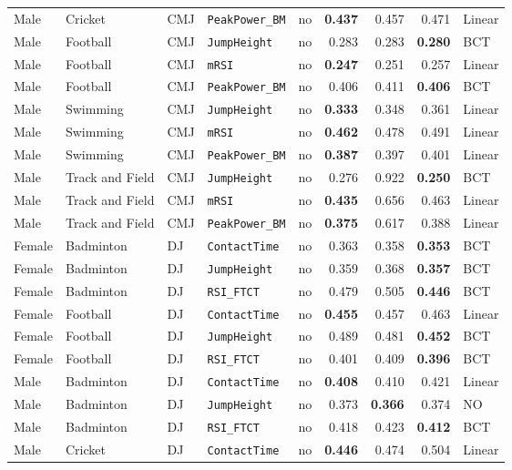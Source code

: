 {\begin{longtable}{lllllrrrl}
Male & Cricket & CMJ & \texttt{PeakPower\_BM} & no & \textbf{0.437} & 0.457 & 0.471 & Linear \\
Male & Football & CMJ & \texttt{JumpHeight} & no & 0.283 & 0.283 & \textbf{0.280} & BCT \\
Male & Football & CMJ & \texttt{mRSI} & no & \textbf{0.247} & 0.251 & 0.257 & Linear \\
Male & Football & CMJ & \texttt{PeakPower\_BM} & no & 0.406 & 0.411 & \textbf{0.406} & BCT \\
Male & Swimming & CMJ & \texttt{JumpHeight} & no & \textbf{0.333} & 0.348 & 0.361 & Linear \\
Male & Swimming & CMJ & \texttt{mRSI} & no & \textbf{0.462} & 0.478 & 0.491 & Linear \\
Male & Swimming & CMJ & \texttt{PeakPower\_BM} & no & \textbf{0.387} & 0.397 & 0.401 & Linear \\
Male & Track and Field & CMJ & \texttt{JumpHeight} & no & 0.276 & 0.922 & \textbf{0.250} & BCT \\
Male & Track and Field & CMJ & \texttt{mRSI} & no & \textbf{0.435} & 0.656 & 0.463 & Linear \\
Male & Track and Field & CMJ & \texttt{PeakPower\_BM} & no & \textbf{0.375} & 0.617 & 0.388 & Linear \\
\addlinespace[1pt]
Female & Badminton & DJ & \texttt{ContactTime} & no & 0.363 & 0.358 & \textbf{0.353} & BCT \\
Female & Badminton & DJ & \texttt{JumpHeight} & no & 0.359 & 0.368 & \textbf{0.357} & BCT \\
Female & Badminton & DJ & \texttt{RSI\_FTCT} & no & 0.479 & 0.505 & \textbf{0.446} & BCT \\
Female & Football & DJ & \texttt{ContactTime} & no & \textbf{0.455} & 0.457 & 0.463 & Linear \\
Female & Football & DJ & \texttt{JumpHeight} & no & 0.489 & 0.481 & \textbf{0.452} & BCT \\
Female & Football & DJ & \texttt{RSI\_FTCT} & no & 0.401 & 0.409 & \textbf{0.396} & BCT \\
Male & Badminton & DJ & \texttt{ContactTime} & no & \textbf{0.408} & 0.410 & 0.421 & Linear \\
Male & Badminton & DJ & \texttt{JumpHeight} & no & 0.373 & \textbf{0.366} & 0.374 & NO \\
Male & Badminton & DJ & \texttt{RSI\_FTCT} & no & 0.418 & 0.423 & \textbf{0.412} & BCT \\
Male & Cricket & DJ & \texttt{ContactTime} & no & \textbf{0.446} & 0.474 & 0.504 & Linear \\

\end{longtable}}
